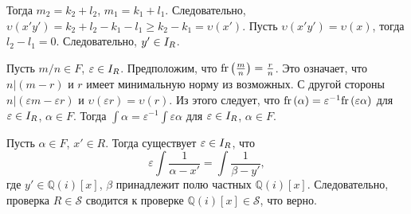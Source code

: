 \documentclass[_00_dissertation.tex]{subfiles}
\begin{document}
\begin{example}
    Тогда $m_2 = k_2 + l_2$, $m_1 = k_1 + l_1$.
    Следовательно, $\upsilon(x'y') = k_2 + l_2 - k_1 - l_1 \ge k_2 - k_1 = \upsilon(x')$.
    Пусть $\upsilon(x'y') = \upsilon(x)$, тогда $l_2 - l_1 = 0$.
    Следовательно, $y' \in I_{R}$.

    Пусть $m/n \in F$, $\varepsilon \in I_{R}$.
    Предположим, что $\textrm{fr}\left(\frac{m}{n}\right) = \frac{r}{n}$.
    Это означает, что $n | (m - r)$ и $r$ имеет минимальную норму из возможных.
    С другой стороны $n | (\varepsilon m - \varepsilon r)$ и $\upsilon(\varepsilon r) = \upsilon(r)$.
    Из этого следует, что $\textrm{fr}\left(\alpha\right) = \varepsilon^{-1}\textrm{fr}\left(\varepsilon\alpha\right)$ для $\varepsilon \in I_{R}$, $\alpha \in F$.
    Тогда $\int{\alpha} = \varepsilon^{-1}\int{\varepsilon\alpha}$ для $\varepsilon \in I_{R}$, $\alpha \in F$.

    Пусть $\alpha \in F$, $x' \in R$.
    Тогда существует $\varepsilon \in I_{R}$, что
    \begin{equation*}
        \varepsilon \int{\frac{1}{\alpha - x'}} = \int{\frac{1}{\beta - y'}},
    \end{equation*}
    где $y' \in \mathbb{Q}(i)[x]$, $\beta$ принадлежит полю частных $\mathbb{Q}(i)[x]$.
    Следовательно, проверка $R \in \mathcal{S}$ сводится к проверке $\mathbb{Q}(i)[x] \in \mathcal{S}$, что верно.
\end{example}
\end{document}
